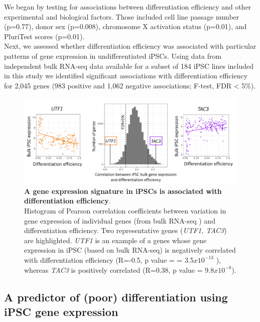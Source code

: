We began by testing for associations between differentiation efficiency and other experimental and biological factors.
Those included cell line passage number (p=0.77), donor sex (p=0.008), chromosome X activation status (p=0.01), and PluriTest scores \cite{muller2011bioinformatic} (p=0.01). \\ %

Next, we assessed whether differentiation efficiency was associated with particular patterns of gene expression in undifferentiated iPSCs. 
Using data from independent bulk RNA-seq data available for a subset of 184 iPSC lines included in this study \cite{kilpinen2017common, bonder2019systematic} we identified significant associations with differentiation efficiency for 2,045 genes (983 positive and 1,062 negative associations; F-test, FDR < 5\%). 

\begin{figure}[h]
\centering
\includegraphics[width=16cm]{Chapter5/Fig/neuroseq_ips_bulk_expr_correlations.png}
\caption[iPS expression signature of differentiation efficiency]{\textbf{A gene expression signature in iPSCs is associated with differentiation efficiency}.\\
Histogram of Pearson correlation coefficients between variation in gene expression of individual genes (from bulk RNA-seq \cite{bonder2019systematic}) and differentiation efficiency. 
Two representative genes (\textit{UTF1, TAC3}) are highlighted. 
\textit{UTF1} is an example of a genes whose gene expression in iPSC (based on bulk RNA-seq) is negatively correlated with differentiation efficiency (R=-0.5, p value = = 3.5$x10^{-13}$ ), whereas \textit{TAC3} is positively correlated (R=0.38, p value = 9.8$x10^{-8}$).}
\label{fig:neuroseq_ips_expression_signature}
\end{figure}

\subsection{A predictor of (poor) differentiation using iPSC gene expression}


